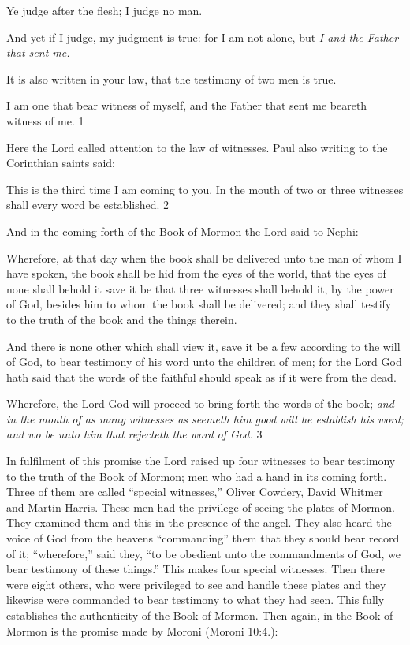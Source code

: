 Ye judge after the flesh; I judge no man.

And yet if I judge, my judgment is true: for I am not alone, but \textit{I and the Father that sent me.}

It is also written in your law, that the testimony of two men is true.

I am one that bear witness of myself, and the Father that sent me beareth witness of me. 1

Here the Lord called attention to the law of witnesses. Paul also writing to the Corinthian
saints said:

This is the third time I am coming to you. In the mouth of two or three witnesses shall every
word be established. 2

And in the coming forth of the Book of Mormon the Lord said to Nephi:

Wherefore, at that day when the book shall be delivered unto the man of whom I have
spoken, the book shall be hid from the eyes of the world, that the eyes of none shall behold it
save it be that three witnesses shall behold it, by the power of God, besides him to whom the
book shall be delivered; and they shall testify to the truth of the book and the things therein.

And there is none other which shall view it, save it be a few according to the will of God, to
bear testimony of his word unto the children of men; for the Lord God hath said that the
words of the faithful should speak as if it were from the dead.

Wherefore, the Lord God will proceed to bring forth the words of the book; \textit{and in the mouth
of as many witnesses as seemeth him good will he establish his word; and wo be unto him
that rejecteth the word of God.} 3

In fulfilment of this promise the Lord raised up four witnesses to bear testimony to the truth
of the Book of Mormon; men who had a hand in its coming forth. Three of them are called
``special witnesses,'' Oliver Cowdery, David Whitmer and Martin Harris. These men had the
privilege of seeing the plates of Mormon. They examined them and this in the presence of the
angel. They also heard the voice of God from the heavens ``commanding'' them that they
should bear record of it; ``wherefore,'' said they, ``to be obedient unto the commandments of
God, we bear testimony of these things.'' This makes four special witnesses. Then there were
eight others, who were privileged to see and handle these plates and they likewise were
commanded to bear testimony to what they had seen. This fully establishes the authenticity
of the Book of Mormon. Then again, in the Book of Mormon is the promise made by Moroni
(Moroni 10:4.):

